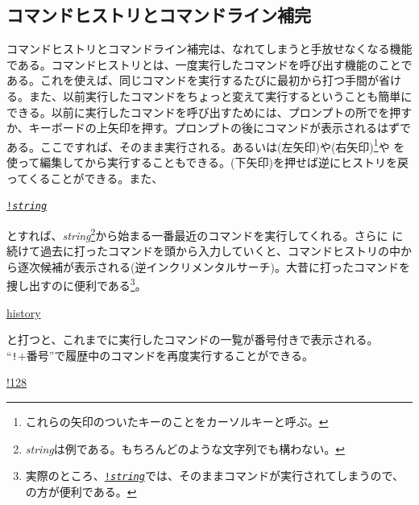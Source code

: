 \subsection{コマンドヒストリとコマンドライン補完}

コマンドヒストリとコマンドライン補完は、なれてしまうと手放せなくなる機能である。コマンドヒストリとは、一度実行したコマンドを呼び出す機能のことである。これを使えば、同じコマンドを実行するたびに最初から打つ手間が省ける。また、以前実行したコマンドをちょっと変えて実行するということも簡単にできる。以前に実行したコマンドを呼び出すためには、プロンプトの所でを押すか、キーボードの上矢印を押す。プロンプトの後にコマンドが表示されるはずである。ここで\ret すれば、そのまま実行される。あるいは(左矢印)や(右矢印)\footnote{これらの矢印のついたキーのことをカーソルキーと呼ぶ。}や \BS を使って編集してから実行することもできる。(下矢印)を押せば逆にヒストリを戻ってくることができる。また、
\begin{commandline2}
    \prompt \underline{\texttt{!\textit{string}}}
\end{commandline2} \noindent
とすれば、\textit{string}\footnote{\textit{string}は例である。もちろんどのような文字列でも構わない。}から始まる一番最近のコマンドを実行してくれる。さらに に続けて過去に打ったコマンドを頭から入力していくと、コマンドヒストリの中から逐次候補が表示される(逆インクリメンタルサーチ)。大昔に打ったコマンドを捜し出すのに便利である\footnote{実際のところ、\underline{\texttt{!\textit{string}}}では、そのままコマンドが実行されてしまうので、の方が便利である。}。
\begin{commandline2}
    \prompt \underline{history}
\end{commandline2} \noindent
と打つと、これまでに実行したコマンドの一覧が番号付きで表示される。
``\texttt{!}+番号''で履歴中のコマンドを再度実行することができる。
\begin{commandline2}
    \prompt \underline{!128}
\end{commandline2} \noindent

